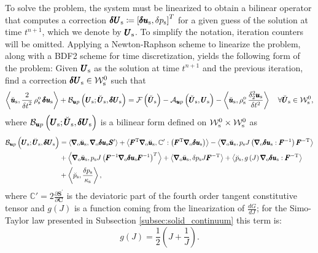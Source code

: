 \documentclass[11pt,english]{article}
\def\usolid{\pmb{u}_{\rm{s}}}                   %
\def\psolid{p_{\rm{s}}}                         %
\def\devPK{\pmb{S}^\prime}                      %
\def\unknosolid{\pmb{U}_{\rm{s}}}               %
\def\testusolid{\breve{\pmb{u}}_{\rm{s}}}       %
\def\testpsolid{\breve{p}_{\rm{s}}}             %
\def\testsolid{\breve{\pmb{U}}_{\rm{s}}}        %
\def\testsolidspace{\mathcal{W}_{\rm{s}}^0}     %
\def\usolidinc{\pmb{\delta u}_{\rm{s}}}                   %
\def\psolidinc{\delta p_{\rm{s}}}                         %
\def\unknosolidinc{\pmb{\delta U}_{\rm{s}}}               %
\def\C{\pmb{C}}                             %
\def\Ftrans{\pmb{F}^{\rm{T}}}               %
\def\invF{\pmb{F}^{-1}}                     %
\def\invFtrans{\pmb{F}^{-\rm{T}}}           %
\def\dGdJ{\frac{dG}{dJ}}                    %
\def\grad{\pmb{\nabla}_{\rm{o}}}        %
\def\denssolid{\rho_{\rm{s}}^{\rm{o}}}  %
\def\kappasolid{\kappa_{\rm{s}}}        %
\def\up{\pmb{u} p}
\def\dt{{\delta t}}                                     %
\def\BDFdudt2{\frac{\delta_2^2 \usolid}{\delta t^2}}    %
\begin{document}
To solve the problem, the system must be linearized to obtain a bilinear operator that computes a correction $\unknosolidinc \coloneqq \left [ \usolidinc, \psolidinc \right ]^T$ for a given guess of the solution at time $t^{n+1}$, which we denote by $\unknosolid$. To simplify the notation, iteration counters will be omitted. Applying a Newton-Raphson scheme to linearize the problem, along with a BDF2 scheme for time discretization, yields the following form of the problem: Given $\unknosolid$ as the solution at time $t^{n+1}$ and  the previous iteration, find a correction $\unknosolidinc \in \testsolidspace$ such that
\begin{equation*}
    \left \langle \testusolid , \frac{2}{\dt^2}\, \denssolid \, \usolidinc \right \rangle + \mathcal{B}_{\up} \left (\unknosolid; \testsolid, \unknosolidinc \right) = \mathcal{F} \left ( \testsolid  \right) -  \mathcal{A}_{\up} \left ( \testsolid , \unknosolid \right) - \left \langle \testusolid, \denssolid \, \BDFdudt2 \right \rangle \quad \forall \testsolid \in \testsolidspace,
\end{equation*}
where $\mathcal{B}_{\up} \left (\unknosolid; \testsolid, \unknosolidinc \right)$ is a bilinear form defined on $\testsolidspace \times \testsolidspace$ as
\begin{alignat*}{1}
    \mathcal{B}_{\up} \left (\unknosolid; \testsolid, \unknosolidinc \right) 
    &= \left \langle \grad \testusolid , \grad \usolidinc \devPK \right \rangle 
    + \left \langle \Ftrans \grad \testusolid ,  \mathbb{C}^\prime : \left (\Ftrans \grad \usolidinc \right ) \right \rangle 
    - \left \langle \grad \testusolid , \psolid J \left ( \grad \usolidinc : \invF \right ) \invFtrans \right \rangle \nonumber \\
    &+ \left \langle \grad \testusolid , \psolid J \left ( \invF \grad \usolidinc \invF \right )^T \right \rangle 
    + \left \langle \grad \testusolid ,  \psolidinc J \invFtrans \right \rangle 
    + \left \langle \testpsolid , g \left(J \right) \grad \usolidinc : \invFtrans \right \rangle \nonumber \\
    &+ \left \langle \testpsolid , \frac{\psolidinc}{\kappasolid} \right \rangle, \nonumber
\end{alignat*}
where $\mathbb{C}\prime = 2\frac{\partial \devPK}{\partial \C}$ is the deviatoric part of the fourth order tangent constitutive tensor and $g \left(J \right)$ is a function coming from the linearization of $\dGdJ$; for the Simo-Taylor law presented in Subsection \ref{subsec:solid_continuum} this term is: 
\begin{equation*}
    g \left(J \right) = \frac{1}{2} \left( J + \frac{1}{J} \right).
\end{equation*}
\end{document}
